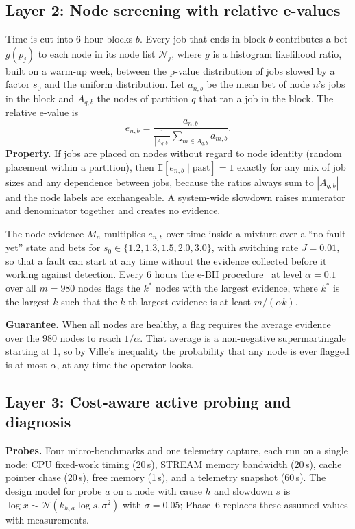 \documentclass[10pt,a4paper]{article}
\begin{document}
\subsection{Layer 2: Node screening with relative e-values}
Time is cut into 6-hour blocks $b$. Every job that ends in block $b$ contributes a bet $g(p_j)$ to each node in its node list $\mathcal N_j$, where $g$ is a histogram likelihood ratio, built on a warm-up week, between the p-value distribution of jobs slowed by a factor $s_0$ and the uniform distribution. Let $a_{n,b}$ be the mean bet of node $n$'s jobs in the block and $A_{q,b}$ the nodes of partition $q$ that ran a job in the block. The relative e-value is
\begin{equation}
e_{n,b} = \frac{a_{n,b}}{\frac{1}{|A_{q,b}|}\sum_{m \in A_{q,b}} a_{m,b}}.
\end{equation}
\textbf{Property.} If jobs are placed on nodes without regard to node identity (random placement within a partition), then $\mathbb E[e_{n,b} \mid \text{past}] = 1$ exactly for any mix of job sizes and any dependence between jobs, because the ratios always sum to $|A_{q,b}|$ and the node labels are exchangeable. A system-wide slowdown raises numerator and denominator together and creates no evidence.

The node evidence $M_n$ multiplies $e_{n,b}$ over time inside a mixture over a ``no fault yet'' state and bets for $s_0 \in \{1.2, 1.3, 1.5, 2.0, 3.0\}$, with switching rate $J = 0.01$, so that a fault can start at any time without the evidence collected before it working against detection. Every 6 hours the e-BH procedure~\cite{ebh} at level $\alpha = 0.1$ over all $m = 980$ nodes flags the $k^\ast$ nodes with the largest evidence, where $k^\ast$ is the largest $k$ such that the $k$-th largest evidence is at least $m/(\alpha k)$.

\textbf{Guarantee.} When all nodes are healthy, a flag requires the average evidence over the 980 nodes to reach $1/\alpha$. That average is a non-negative supermartingale starting at 1, so by Ville's inequality the probability that any node is ever flagged is at most $\alpha$, at any time the operator looks.

\subsection{Layer 3: Cost-aware active probing and diagnosis}
\textbf{Probes.} Four micro-benchmarks and one telemetry capture, each run on a single node: CPU fixed-work timing (20\,s), STREAM memory bandwidth (20\,s), cache pointer chase (20\,s), free memory (1\,s), and a telemetry snapshot (60\,s). The design model for probe $a$ on a node with cause $h$ and slowdown $s$ is $\log x \sim \mathcal N(k_{h,a} \log s, \sigma^2)$ with $\sigma = 0.05$; Phase~6 replaces these assumed values with measurements.
\end{document}
